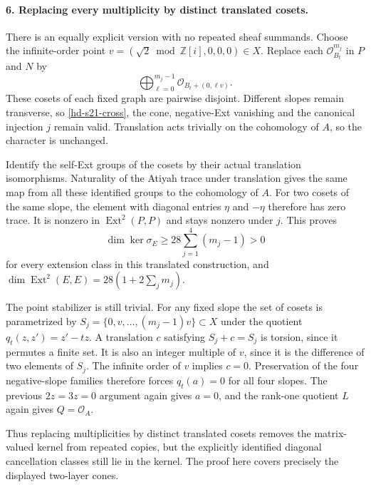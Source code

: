 \paragraph{6. Replacing every multiplicity by distinct translated cosets.}
There is an equally explicit version with no repeated sheaf summands.
Choose the infinite-order point
$v=(\sqrt2\bmod\mathbb Z[i],0,0,0)\in X$.
Replace each $\mathcal O_{B_t}^{m_j}$ in $P$ and $N$ by
\[
 \bigoplus_{\ell=0}^{m_j-1}
   \mathcal O_{B_t+(0,\ell v)}.
\]
These cosets of each fixed graph are pairwise disjoint. Different
slopes remain transverse, so \eqref{hd-s21-cross}, the cone,
negative-Ext vanishing and the canonical injection $j$ remain valid.
Translation acts trivially on the cohomology of $A$, so the character
is unchanged.

Identify the self-Ext groups of the cosets by their actual translation
isomorphisms. Naturality of the Atiyah trace under translation gives
the same map from all these identified groups to the cohomology of
$A$. For two cosets of the same slope, the element with diagonal
entries $\eta$ and $-\eta$ therefore has zero trace. It is nonzero
in $\operatorname{Ext}^2(P,P)$ and stays nonzero under $j$.
This proves
\[
 \dim\ker\sigma_E\ge28\sum_{j=1}^4(m_j-1)>0
\]
for every extension class in this translated construction, and
$\dim\operatorname{Ext}^2(E,E)=28(1+2\sum_jm_j)$.

The point stabilizer is still trivial. For any fixed slope the set
of cosets is parametrized by
$S_j=\{0,v,\ldots,(m_j-1)v\}\subset X$ under the quotient
$q_t(z,z')=z'-tz$. A translation $c$ satisfying $S_j+c=S_j$ is
torsion, since it permutes a finite set. It is also an integer
multiple of $v$, since it is the difference of two elements of
$S_j$. The infinite order of $v$ implies $c=0$. Preservation of
the four negative-slope families therefore forces
$q_t(a)=0$ for all four slopes. The previous $2z=3z=0$ argument
again gives $a=0$, and the rank-one quotient $L$ again gives
$Q=\mathcal O_A$.

Thus replacing multiplicities by distinct translated cosets removes
the matrix-valued kernel from repeated copies, but the explicitly
identified diagonal cancellation classes still lie in the kernel.
The proof here covers precisely the displayed two-layer cones.

